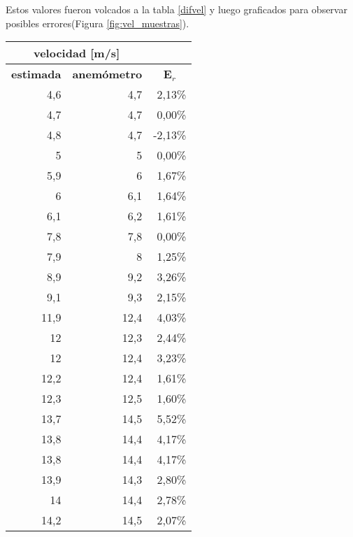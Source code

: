 Estos valores fueron volcados a la tabla \ref{difvel} y luego graficados para observar posibles errores(Figura \ref{fig:vel_muestras}).

\begin{table}[H]
	\centering
	\begin{tabular}{|r|r|r}
		\cline{1-2}
		\multicolumn{2}{|c|}{velocidad {[}m/s{]}} & \multicolumn{1}{l}{} \\ \hline
		\multicolumn{1}{|c|}{\textbf{estimada}} & \multicolumn{1}{c|}{\textbf{anemómetro}} & \multicolumn{1}{c|}{\textbf{E$_r$}} \\ \hline
		4,6 & 4,7 & \multicolumn{1}{r|}{2,13\%} \\ \hline
		4,7 & 4,7 & \multicolumn{1}{r|}{0,00\%} \\ \hline
		4,8 & 4,7 & \multicolumn{1}{r|}{-2,13\%} \\ \hline
		5 & 5 & \multicolumn{1}{r|}{0,00\%} \\ \hline
		5,9 & 6 & \multicolumn{1}{r|}{1,67\%} \\ \hline
		6 & 6,1 & \multicolumn{1}{r|}{1,64\%} \\ \hline
		6,1 & 6,2 & \multicolumn{1}{r|}{1,61\%} \\ \hline
		7,8 & 7,8 & \multicolumn{1}{r|}{0,00\%} \\ \hline
		7,9 & 8 & \multicolumn{1}{r|}{1,25\%} \\ \hline
		8,9 & 9,2 & \multicolumn{1}{r|}{3,26\%} \\ \hline
		9,1 & 9,3 & \multicolumn{1}{r|}{2,15\%} \\ \hline
		11,9 & 12,4 & \multicolumn{1}{r|}{4,03\%} \\ \hline
		12 & 12,3 & \multicolumn{1}{r|}{2,44\%} \\ \hline
		12 & 12,4 & \multicolumn{1}{r|}{3,23\%} \\ \hline
		12,2 & 12,4 & \multicolumn{1}{r|}{1,61\%} \\ \hline
		12,3 & 12,5 & \multicolumn{1}{r|}{1,60\%} \\ \hline
		13,7 & 14,5 & \multicolumn{1}{r|}{5,52\%} \\ \hline
		13,8 & 14,4 & \multicolumn{1}{r|}{4,17\%} \\ \hline
		13,8 & 14,4 & \multicolumn{1}{r|}{4,17\%} \\ \hline
		13,9 & 14,3 & \multicolumn{1}{r|}{2,80\%} \\ \hline
		14 & 14,4 & \multicolumn{1}{r|}{2,78\%} \\ \hline
		14,2 & 14,5 & \multicolumn{1}{r|}{2,07\%} \\ \hline

\end{tabular}
\end{table}
